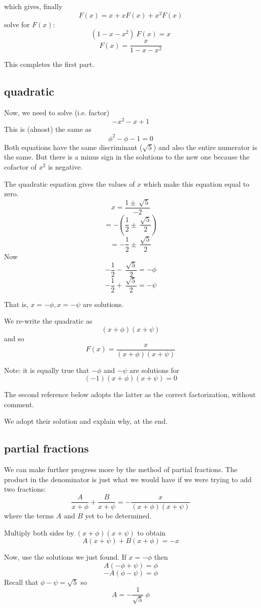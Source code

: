 \documentclass[11pt, oneside]{article}
\begin{document}
which gives, finally
\[ F(x) = x + x F(x) + x^2 F(x) \]
solve for $F(x)$:
\[ (1 - x - x^2) \ F(x) = x \]
\[ F(x) = \frac{x}{1 - x  - x^2} \]

This completes the first part.

\subsection*{quadratic}

Now, we need to solve (i.e. factor)
\[ -x^2 - x + 1 \]
This is (almost) the same as
\[ \phi^2 - \phi - 1 = 0 \]
Both equations have the same discriminant ($\sqrt{5}$) and also the entire numerator is the same.  But there is a minus sign in the solutions to the new one because the cofactor of $x^2$ is negative.

The quadratic equation gives the values of $x$ which make this equation equal to zero.
\[ x = \frac{1 \pm \ \sqrt{5}}{-2} \]
\[ = - ( \frac{1}{2} \pm \ \frac{\sqrt{5}}{2} ) \]
\[ = - \frac{1}{2} \pm \ \frac{\sqrt{5}}{2}  \]
Now 
\[ - \frac{1}{2} - \ \frac{\sqrt{5}}{2} = - \phi \]
\[ - \frac{1}{2} + \ \frac{\sqrt{5}}{2} = - \psi \]

That is, $x = - \phi, x = - \psi$ are solutions. 

We re-write the quadratic as
\[ (x + \phi)(x + \psi) \]
and so
\[ F(x) = \frac{x}{(x + \phi)(x + \psi)} \]

Note:  it is equally true that $-\phi$ and $-\psi$ are solutions for
\[ (-1)(x + \phi)(x + \psi)  = 0 \]

The second reference below adopts the latter as the correct factorization, without comment.  

We adopt their solution and explain why, at the end.

\subsection*{partial fractions}

We can make further progress more by the method of partial fractions.  The product in the denominator is just what we would have if we were trying to add two fractions:
\[ \frac{A}{x + \phi} + \frac{B}{x + \psi} = - \frac{x}{(x + \phi)(x +\psi)} \]
where the terms $A$ and $B$ yet to be determined.

Multiply both sides by $(x + \phi)(x + \psi)$ to obtain
\[ A(x + \psi) + B(x + \phi) = - x \]

Now, use the solutions we just found.  If $x = - \phi$ then
\[ A(-\phi + \psi)  = \phi \]
\[ - A(\phi - \psi)  = \phi  \]
Recall that $\phi - \psi = \sqrt{5}$ so
\[ A = - \frac{1}{\sqrt{5}} \ \phi \]
\end{document}
